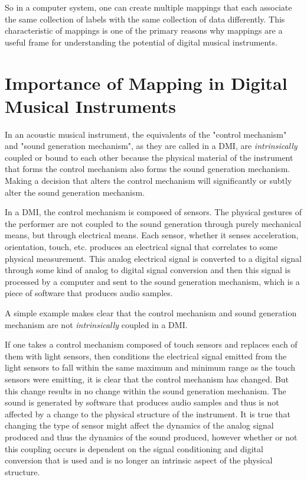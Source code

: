So in a computer system, one can create multiple mappings that each associate the same collection of labels with the same collection of data differently. This characteristic of mappings is one of the primary reasons why mappings are a useful frame for understanding the potential of digital musical instruments. 

\section{Importance of Mapping in Digital Musical Instruments}

In an acoustic musical instrument, the equivalents of the "control mechanism" and "sound generation mechanism", as they are called in a DMI, are \emph{intrinsically} coupled or bound to each other because the physical material of the instrument that forms the control mechanism also forms the sound generation mechanism. Making a decision that alters the control mechanism will significantly or subtly alter the sound generation mechanism.

In a DMI, the control mechanism is composed of sensors. The physical gestures of the performer are not coupled to the sound generation through purely mechanical means, but through electrical means. Each sensor, whether it senses acceleration, orientation, touch, etc. produces an electrical signal that correlates to some physical measurement. This analog electrical signal is converted to a digital signal through some kind of analog to digital signal conversion and then this signal is processed by a computer and sent to the sound generation mechanism, which is a piece of software that produces audio samples.

A simple example makes clear that the control mechanism and sound generation mechanism are not \emph{intrinsically} coupled in a DMI.

If one takes a control mechanism composed of touch sensors and replaces each of them with light sensors, then conditions the electrical signal emitted from the light sensors to fall within the same maximum and minimum range as the touch sensors were emitting, it is clear that the control mechanism has changed. But this change results in no change within the sound generation mechanism. The sound is generated by software that produces audio samples and thus is not affected by a change to the physical structure of the instrument. It is true that changing the type of sensor might affect the dynamics of the analog signal produced and thus the dynamics of the sound produced, however whether or not this coupling occurs is dependent on the signal conditioning and digital conversion that is used and is no longer an intrinsic aspect of the physical structure.

